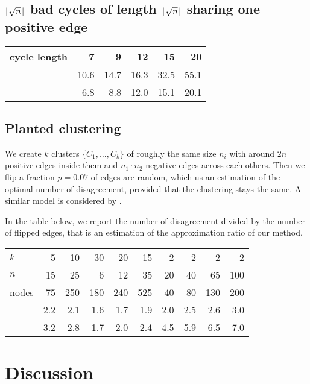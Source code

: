 \subsection{$\floor*{\sqrt{n}}$ bad cycles of length $\floor*{\sqrt{n}}$
	sharing one positive edge}

\begin{center}
\begin{tabular}{lrrrrr}
\toprule
cycle length &   7  &   9  &   12 &   15 &   20 \\
\midrule
\pot{} & 10.6 & 14.7 & 16.3 & 32.5 & 55.1 \\
\pat{} &  6.8 &  8.8 & 12.0 & 15.1 & 20.1 \\
\bottomrule
\end{tabular}
\end{center}

\subsection{Planted clustering}

We create $k$ clusters $\{C_1, \ldots, C_k\}$ of roughly the same size $n_i$
with around $2n$ positive edges inside them and $n_1\cdot n_2$ negative edges
across each others. Then we flip a fraction $p=0.07$ of edges are random,
which us an estimation of the optimal number of disagreement, provided that
the clustering stays the same. A similar model is considered by
\textcite{Makarychev2014}.

In the table below, we report the number of disagreement divided by the
number of flipped edges, that is an estimation of the approximation ratio of
our method.

\begin{center}
\begin{tabular}{lrrrrrrrrr}
\toprule
$k$      & 5   & 10  & 30  & 20  & 15  & 2   & 2   & 2   & 2  \\
$n$      & 15  & 25  & 6   & 12  & 35  & 20  & 40  & 65  & 100 \\
nodes    & 75  & 250 & 180 & 240 & 525 & 40  & 80  & 130 & 200 \\
\midrule
\pat{}   & 2.2 & 2.1 & 1.6 & 1.7 & 1.9 & 2.0 & 2.5 & 2.6 & 3.0 \\
\pot{}   & 3.2 & 2.8 & 1.7 & 2.0 & 2.4 & 4.5 & 5.9 & 6.5 & 7.0 \\
\bottomrule
\end{tabular}
\end{center}

\section{Discussion}

